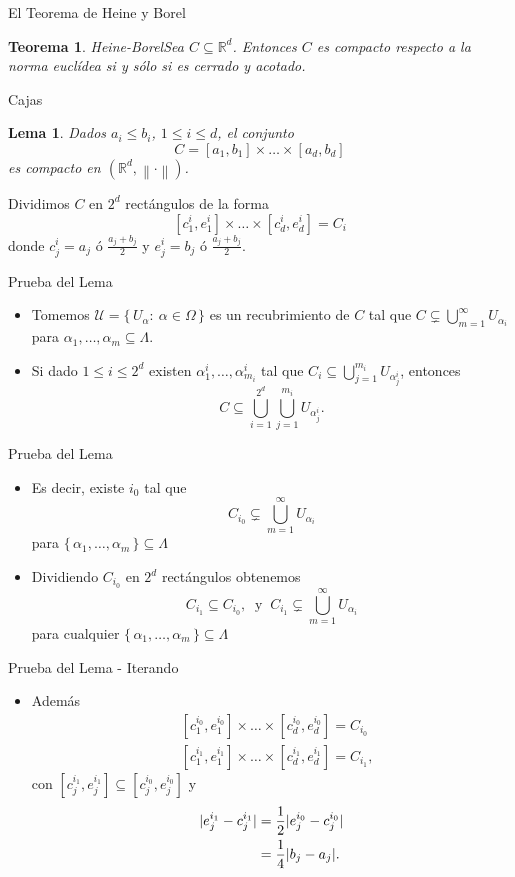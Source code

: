 \documentclass[utf8]{beamer}
\theoremstyle{plain}
\newtheorem{Th}{Teorema}               %
\newtheorem{Lem}{Lema}                 %
\theoremstyle{definition}
\theoremstyle{remark}
\numberwithin{equation}{section}
\newcommand{\al}{\alpha}                %
\newcommand{\La}{\Lambda}               %
\newcommand{\Om}{\Omega}                %
\newcommand{\bR}{\mathbb{R}}    %
\newcommand{\cU}{\mathcal{U}}           %
\newcommand{\nm}[1]{\left\|#1\right\|} %
\newcommand{\set}[1]{\{\,#1\,\}}    %
\renewcommand{\leq}{\leqslant}          %
\newcommand{\x}{\times}
\newcommand{\xyx}{\times\dots\times}
\newcommand{\half}{{\mathchoice{\nhalf}{\thalf}{\shalf}{\shalf}}} %
\newcommand{\nhalf}{\frac{1}{2}}
\newcommand{\shalf}{{\scriptstyle\frac{1}{2}}} %
\newcommand{\thalf}{{\tfrac{1}{2}}} %
\newcommand{\sucm}{_{m=1}^\infty} %
\begin{document}
\begin{frame}{El Teorema de Heine y Borel}
  \begin{Th}{Heine-Borel}\label{thm:HeineBorel}
    Sea $C\subseteq\bR^d$. Entonces $C$ es compacto respecto a la norma euclídea si y sólo si es cerrado y acotado.
  \end{Th}
\end{frame}

\begin{frame}{Cajas}
\begin{Lem}\label{lem:cajasCompactas}
  Dados $a_i\leq b_i$, $1\leq i\leq d$, el conjunto
  $$C=[a_1,b_1]\x\dots\x[a_d,b_d]$$
  es compacto en $(\bR^d,\nm{\cdot})$.
\end{Lem}  
Dividimos $C$ en $2^d$ rectángulos de la forma 
$$[c_1^i,e_1^i]\xyx[c_d^i,e_d^i]=C_i$$
donde $c_j^i=a_j$ ó $\frac{a_j+b_j}{2}$ y $e_j^i=b_j$ ó $\frac{a_j+b_j}{2}$.
\end{frame}

\begin{frame}{Prueba del Lema}
  \begin{itemize}
    \item Tomemos $\cU=\set{U_\al:\ \al\in\Om}$ es un recubrimiento de $C$ tal que $C\subsetneq\bigcup\sucm U_{\al_i}$ para ${\al_1,\dots,\al_m}\subseteq \La$.
    \item Si dado $1\leq i\leq 2^d$ existen $\al^i_1,\dots,\al_{m_i}^i$ tal que $C_i\subseteq \bigcup_{j=1}^{m_i}U_{\al_j^i}$, entonces 
    $$C\subseteq \bigcup_{i=1}^{2^d}\bigcup_{j=1}^{m_i}U_{\al_j^i}.$$
  \end{itemize}
  
\end{frame}{Prueba del Lema}
\begin{itemize}
  \item Es decir, existe $i_0$ tal que 
  $$C_{i_0}\subsetneq\bigcup\sucm U_{\al_i}$$
  para $\set{\al_1,\dots,\al_m}\subseteq\La$
  \item Dividiendo $C_{i_0}$ en $2^d$ rectángulos obtenemos 
  $$C_{i_1}\subseteq C_{i_0},\ \text{ y }\ C_{i_1}\subsetneq \bigcup\sucm U_{\al_i}$$
  para cualquier $\set{\al_1,\dots,\al_m}\subseteq\La$
  
\end{itemize}

\begin{frame}{Prueba del Lema - Iterando}
  \begin{itemize}
    \item Además 
    \begin{align*}
      &[c_1^{i_0},e_1^{i_0}]\xyx[c_d^{i_0},e_d^{i_0}]=C_{i_0}\\
      &[c_1^{i_1},e_1^{i_1}]\xyx[c_d^{i_1},e_d^{i_1}]=C_{i_1},
    \end{align*}
    con $[c_j^{i_1},e_j^{i_1}]\subseteq[c_j^{i_0},e_j^{i_0}]$ y 
    \begin{align*}
      |e_j^{i_1}-c_j^{i_1}|&=\half|e_j^{i_0}-c_j^{i_0}|\\
      &=\frac14|b_j-a_j|.
    \end{align*}
  \end{itemize}
\end{frame}
\end{document}
